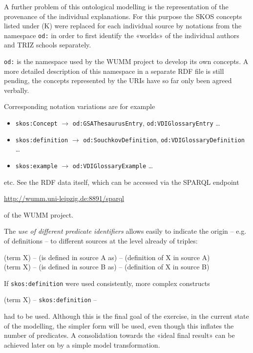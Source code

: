 \documentclass[11pt,a4paper]{article}
\begin{document}
A further problem of this ontological modelling is the representation of the
provenance of the individual explanations. For this purpose the SKOS concepts
listed under (K) were replaced for each individual source by notations from
the namespace \texttt{od:} in order to first identify the «worlds» of the
individual authors and TRIZ schools separately.

\texttt{od:} is the namespace used by the WUMM project to develop its own
concepts.  A more detailed description of this namespace in a separate RDF
file is still pending, the concepts represented by the URIs have so far only
been agreed verbally.

Corresponding notation variations are for example
\begin{itemize}[noitemsep]
\item \texttt{skos:Concept} $\to$ \texttt{od:GSAThesaurusEntry},
  \texttt{od:VDIGlossaryEntry} \ldots
\item \texttt{skos:definition} $\to$ \texttt{od:SouchkovDefinition},
  \texttt{od:VDIGlossaryDefinition} \ldots
\item \texttt{skos:example} $\to$ \texttt{od:VDIGlossaryExample} \ldots
\end{itemize}
etc. See the RDF data itself, which can be accessed via the SPARQL endpoint
\begin{center}
  \url{http://wumm.uni-leipzig.de:8891/sparql}
\end{center}
of the WUMM project.

The \emph{use of different predicate identifiers} allows easily to indicate
the origin -- e.g. of definitions -- to different sources at the level already
of triples:
\begin{center}
  (term X) -- (is defined in source A as) -- (definition of X in
  source A)\\ 
  (term X) -- (is defined in source B as) -- (definition of X in
  source B) 
\end{center}
If \texttt{skos:definition} were used consistently, more complex constructs
\begin{center}
  (term X) -- \texttt{skos:definition} -- 
\end{center}
had to be used. Although this is the final goal of the exercise, in the
current state of the modelling, the simpler form will be used, even though
this inflates the number of predicates. A consolidation towards the «ideal
final result» can be achieved later on by a simple model transformation.  
\end{document}
